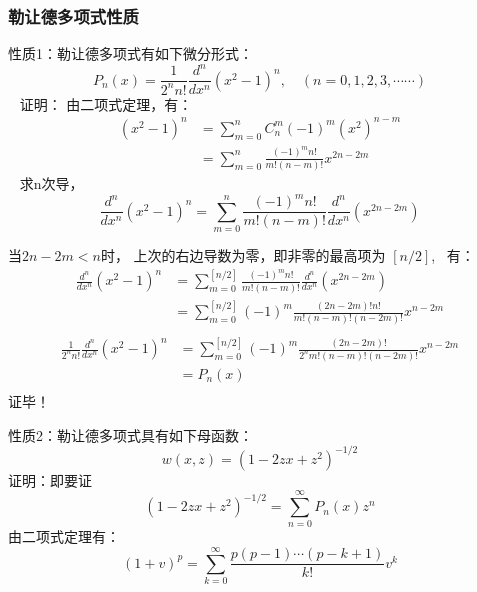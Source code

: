 \begin{frame}
	\frametitle{勒让德多项式性质}
	\alert{性质1}：勒让德多项式有如下微分形式：
	\begin{equation*}
		P_{n}(x)=\frac{1}{2^{n} n !} \frac{d^{n}}{d x^{n}}\left(x^{2}-1\right)^{n}, \quad(n=0,1,2,3, \cdots \cdots)
	\end{equation*}	 
	\alert{证明：} 由二项式定理，有：
	\begin{align*}
		\left(x^{2}-1\right)^{n}&=\sum_{m=0}^{n} C_{n}^{m}(-1)^{m}\left(x^{2}\right)^{n-m}\\
		&=\sum_{m=0}^{n} \frac{(-1)^{m} n !}{m !(n-m) !} x^{2 n-2 m}
	\end{align*}	 
	求n次导，
	\begin{equation*}
		\frac{d^{n}}{d x^{n}}\left(x^{2}-1\right)^{n}=\sum_{m=0}^{n} \frac{(-1)^{m} n !}{m !(n-m) !} \frac{d^{n}}{d x^{n}}\left(x^{2 n-2 m}\right)
	\end{equation*}	
\end{frame}	

\begin{frame}
	当$2n-2m<n$时， 上次的右边导数为零，即非零的最高项为 $[n/2]$,  有：
	\begin{align*}
		\frac{d^{n}}{d x^{n}}\left(x^{2}-1\right)^{n}&=\sum_{m=0}^{[n/2]} \frac{(-1)^{m} n !}{m !(n-m) !} \frac{d^{n}}{d x^{n}}\left(x^{2 n-2 m}\right)\\
		&=\sum_{m=0}^{[n / 2]}(-1)^{m} \frac{(2 n-2 m) ! n!}{ m !(n-m) !(n-2 m) !} x^{n-2 m}\\
	\end{align*}	
	\begin{align*}
		\frac{1}{2^{n} n !} \frac{d^{n}}{d x^{n}}\left(x^{2}-1\right)^{n} &= \sum_{m=0}^{[n / 2]}(-1)^{m} \frac{(2 n-2 m) !}{2^{n} m !(n-m) !(n-2 m) !} x^{n-2 m}\\
		&=P_n(x)\\
	\end{align*}	
	\alert{证毕！}
\end{frame}	

\begin{frame}
	\alert{性质2：}勒让德多项式具有如下母函数：
	\begin{equation*}
		w(x, z)=\left(1-2 z x+z^{2}\right)^{-1 / 2}
	\end{equation*}	
	\alert{证明：}即要证
	\begin{equation*}
		\left(1-2 z x+z^{2}\right)^{-1 / 2}=\sum_{n=0}^{\infty} P_n(x) z^n
	\end{equation*}	
	由二项式定理有：
	\begin{equation*}
		(1+v)^{p}=\sum_{k=0}^{\infty} \frac{p(p-1) \cdots(p-k+1)}{k !} v^{k}
	\end{equation*}	
\end{frame}	

